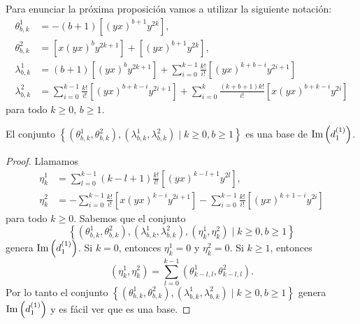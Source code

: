\documentclass[fleqn,../tesis.tex]{subfiles}
\begin{document}
Para enunciar la próxima proposición vamos a utilizar la siguiente notación:
\begin{align*}
    \theta^{1}_{b, k} &= -(b + 1)\left[(yx)^{b + 1}y^{2k}\right],\\
    \theta^{2}_{b, k} &= \left[x(yx)^by^{2k + 1}\right] + \left[(yx)^{b + 1}y^{2k}\right],\\
    \lambda^{1}_{b, k} &= (b + 1)\left[(yx)^{b}y^{2k + 1}\right]
        +\sum_{i  = 0}^{k - 1}\frac{k!}{i!}\left[(yx)^{k + b - i}y^{2i + 1}\right]\\
    \lambda^{2}_{b, k} &= \sum_{i = 0}^{k - 1}\frac{k!}{i!}\left[(yx)^{b + k - i}y^{2i + 1}\right]
        + \sum_{i = 0}^{k}\frac{(k + b + 1)k!}{i!}\left[x(yx)^{b + k - i}y^{2i}\right]
\end{align*}
para todo $k \geq 0$, $b \geq 1$.
\begin{prop}\label{prop_imad11}
    El conjunto $\left\lbrace\left(\theta^{1}_{b, k}, \theta^{2}_{b, k}\right),
        \left(\lambda^{1}_{b, k}, \lambda^{2}_{b, k}\right) \mid k \geq 0, b\geq 1\right\rbrace$ es una base de $\operatorname{Im}\left(d_1^{(1)}\right)$.
\end{prop}
\begin{proof}
Llamamos
\begin{align*}
    \eta^{1}_k &= \sum_{l = 0}^{k - 1}(k - l + 1)\frac{k!}{l!}\left[(yx)^{k - l + 1}y^{2l}\right],\\
    \eta^{2}_k &= -\sum_{i = 0}^{k - 1}\frac{k!}{i!}\left[x(yx)^{k - i}y^{2i + 1}\right]
        - \sum_{i = 0}^{k - 1}\frac{k!}{i!}\left[(yx)^{k + 1 - i}y^{2i}\right]
\end{align*}
para todo $k \geq 0$. Sabemos que el conjunto
    \[
        \left\lbrace \left(\theta^{1}_{b, k}, \theta^{2}_{b, k}\right),
            \left(\lambda^{1}_{b, k}, \lambda^{2}_{b, k}\right),  \left(\eta^{1}_{k}, \eta^{2}_{k}\right)
                \mid k \geq 0, b\geq 1\right\rbrace
    \]
genera $\operatorname{Im}\left(d_1^{(1)}\right)$. Si $k = 0$, entonces $\eta^1_k = 0$ y $\eta^2_k = 0$. Si $k \geq 1$, entonces
\[
    \left(\eta^{1}_k, \eta^{2}_k\right) = \sum_{l = 0}^{k - 1}\left(\theta^{1}_{k - l, l}, \theta^{2}_{k - l, l}\right).
\]
Por lo tanto el conjunto $\left\lbrace\left(\theta^{1}_{b, k}, \theta^{2}_{b, k}\right),
        \left(\lambda^{1}_{b, k}, \lambda^{2}_{b, k}\right) \mid k \geq 0, b\geq 1\right\rbrace$ genera $\operatorname{Im}\left(d_1^{(1)}\right)$
y es fácil ver que es una base.
\end{proof}
\end{document}
